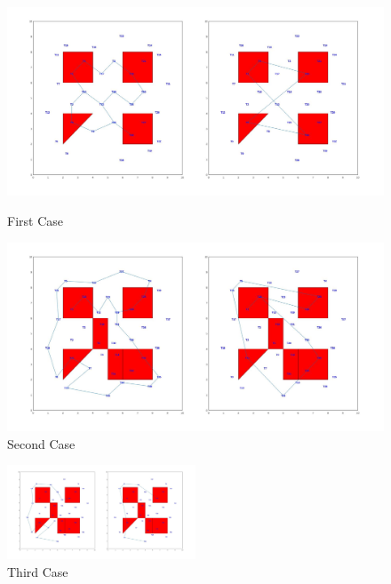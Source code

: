 \documentclass[conference,12pt]{IEEEtran}
\begin{document}
\begin{figure}[t]
	\begin{minipage}{\columnwidth}
		\centering
		\includegraphics[width=\textwidth]{./1example/path.jpg}
		\caption{First Case}
		\label{first}
	\end{minipage}%
	\begin{minipage}{\columnwidth}
		\centering
		\includegraphics[width=\textwidth]{./2example/path.jpg}
		\caption{Second Case}
		\label{second}
	\end{minipage}
\end{figure}

\begin{figure}[t]
\centerline{\includegraphics[width=0.5\textwidth]{./4example/path.jpg}}
\caption{Third Case}
\label{third}
\end{figure}
\end{document}
